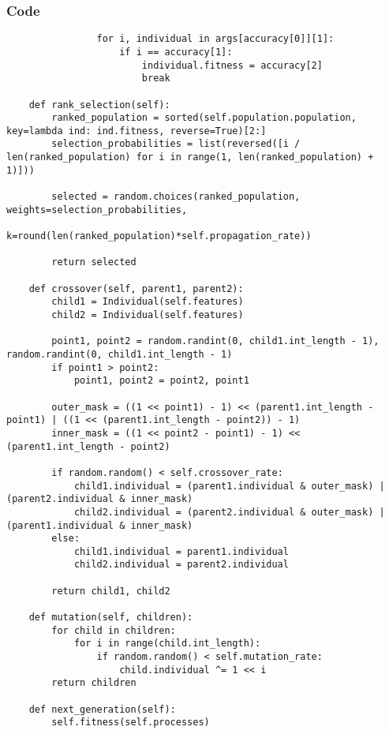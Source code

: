 \documentclass{beamer}
\begin{document}
\begin{frame}[fragile]
    \frametitle{Code}
    \fontsize{3pt}{5pt}\selectfont
    \begin{verbatim}
                for i, individual in args[accuracy[0]][1]:
                    if i == accuracy[1]:
                        individual.fitness = accuracy[2]
                        break

    def rank_selection(self):
        ranked_population = sorted(self.population.population, key=lambda ind: ind.fitness, reverse=True)[2:]
        selection_probabilities = list(reversed([i / len(ranked_population) for i in range(1, len(ranked_population) + 1)]))

        selected = random.choices(ranked_population, weights=selection_probabilities,
                                  k=round(len(ranked_population)*self.propagation_rate))

        return selected
    
    def crossover(self, parent1, parent2):
        child1 = Individual(self.features)
        child2 = Individual(self.features)

        point1, point2 = random.randint(0, child1.int_length - 1), random.randint(0, child1.int_length - 1)
        if point1 > point2:
            point1, point2 = point2, point1

        outer_mask = ((1 << point1) - 1) << (parent1.int_length - point1) | ((1 << (parent1.int_length - point2)) - 1)
        inner_mask = ((1 << point2 - point1) - 1) << (parent1.int_length - point2)

        if random.random() < self.crossover_rate:
            child1.individual = (parent1.individual & outer_mask) | (parent2.individual & inner_mask)
            child2.individual = (parent2.individual & outer_mask) | (parent1.individual & inner_mask)
        else:
            child1.individual = parent1.individual
            child2.individual = parent2.individual

        return child1, child2
    
    def mutation(self, children):
        for child in children:
            for i in range(child.int_length):
                if random.random() < self.mutation_rate:
                    child.individual ^= 1 << i
        return children
    
    def next_generation(self):
        self.fitness(self.processes)
    \end{verbatim}
\end{frame}
\end{document}
